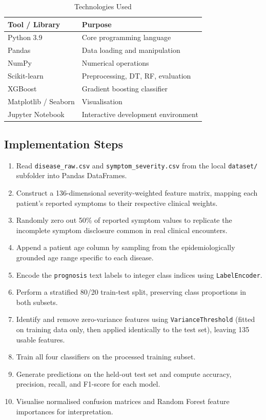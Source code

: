\documentclass[12pt,a4paper]{article}
\begin{document}
\begin{table}[H]
\centering
\caption{Technologies Used}
\begin{tabular}{ll}
\toprule
\textbf{Tool / Library} & \textbf{Purpose} \\
\midrule
Python 3.9              & Core programming language \\
Pandas                  & Data loading and manipulation \\
NumPy                   & Numerical operations \\
Scikit-learn            & Preprocessing, DT, RF, evaluation \\
XGBoost                 & Gradient boosting classifier \\
Matplotlib / Seaborn    & Visualisation \\
Jupyter Notebook        & Interactive development environment \\
\bottomrule
\end{tabular}
\end{table}

\subsection{Implementation Steps}

\begin{enumerate}
    \item Read \texttt{disease\_raw.csv} and \texttt{symptom\_severity.csv} from the local \texttt{dataset/} subfolder into Pandas DataFrames.
    \item Construct a 136-dimensional severity-weighted feature matrix, mapping each patient's reported symptoms to their respective clinical weights.
    \item Randomly zero out 50\% of reported symptom values to replicate the incomplete symptom disclosure common in real clinical encounters.
    \item Append a patient age column by sampling from the epidemiologically grounded age range specific to each disease.
    \item Encode the \texttt{prognosis} text labels to integer class indices using \texttt{LabelEncoder}.
    \item Perform a stratified 80/20 train-test split, preserving class proportions in both subsets.
    \item Identify and remove zero-variance features using \texttt{VarianceThreshold} (fitted on training data only, then applied identically to the test set), leaving 135 usable features.
    \item Train all four classifiers on the processed training subset.
    \item Generate predictions on the held-out test set and compute accuracy, precision, recall, and F1-score for each model.
    \item Visualise normalised confusion matrices and Random Forest feature importances for interpretation.
\end{enumerate}
\end{document}
